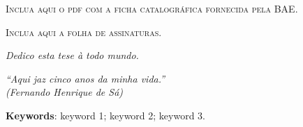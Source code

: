 \imprimircapa


\setcounter{page}{3}
\imprimirfolhaderosto*


\begin{fichacatalografica}
    \vspace*{\fill}
    \begin{center}
        \textsc{Inclua aqui o pdf com a ficha catalográfica fornecida pela BAE.}
    \end{center}
    \vspace*{\fill}
\end{fichacatalografica}


\newpage
\vspace*{\fill}
\begin{center}
    \textsc{Inclua aqui a folha de assinaturas.}
\end{center}
\vspace*{\fill}
\newpage
%
\cleardoublepage


\begin{dedicatoria}
    \vspace*{\fill}
    \centering
    \noindent
    \textit{Dedico esta tese à todo mundo.}
    \vspace*{\fill}
\end{dedicatoria}

\begin{agradecimentos}
    
\end{agradecimentos}

\begin{epigrafe}
    \vspace*{\fill}
    \begin{flushright}
        \textit{``Aqui jaz cinco anos da minha vida.''\\
        (Fernando Henrique de Sá)}
    \end{flushright}
\end{epigrafe}

\begin{resumo}
    
    \vspace{\onelineskip}
    \noindent\textbf{Keywords}: keyword 1; keyword 2; keyword 3.
    \vspace{\fill}
\end{resumo}

